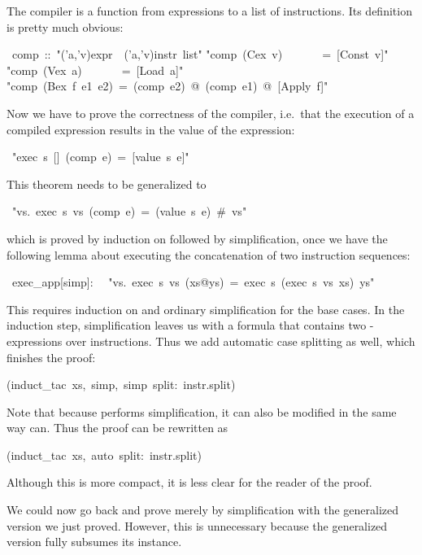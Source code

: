 \begin{isabelle}
\begin{isamarkuptext}
The compiler is a function from expressions to a list of instructions. Its
definition is pretty much obvious:%
\end{isamarkuptext}%
~comp~::~{"}('a,'v)expr~{\isasymRightarrow}~('a,'v)instr~list{"}\isanewline
{}\isanewline
{"}comp~(Cex~v)~~~~~~~=~[Const~v]{"}\isanewline
{"}comp~(Vex~a)~~~~~~~=~[Load~a]{"}\isanewline
{"}comp~(Bex~f~e1~e2)~=~(comp~e2)~@~(comp~e1)~@~[Apply~f]{"}%
\begin{isamarkuptext}%
Now we have to prove the correctness of the compiler, i.e.\ that the
execution of a compiled expression results in the value of the expression:%
\end{isamarkuptext}%
~{"}exec~s~[]~(comp~e)~=~[value~s~e]{"}%
\begin{isamarkuptext}%
\noindent
This theorem needs to be generalized to%
\end{isamarkuptext}%
~{"}{\isasymforall}vs.~exec~s~vs~(comp~e)~=~(value~s~e)~\#~vs{"}%
\begin{isamarkuptxt}%
\noindent
which is proved by induction on  followed by simplification, once
we have the following lemma about executing the concatenation of two
instruction sequences:%
\end{isamarkuptxt}%
~exec\_app[simp]:\isanewline
~~{"}{\isasymforall}vs.~exec~s~vs~(xs@ys)~=~exec~s~(exec~s~vs~xs)~ys{"}%
\begin{isamarkuptxt}%
\noindent
This requires induction on  and ordinary simplification for the
base cases. In the induction step, simplification leaves us with a formula
that contains two -expressions over instructions. Thus we add
automatic case splitting as well, which finishes the proof:%
\end{isamarkuptxt}%
(induct\_tac~xs,~simp,~simp~split:~instr.split)%
\begin{isamarkuptext}%
\noindent
Note that because  performs simplification, it can
also be modified in the same way  can. Thus the proof can be
rewritten as%
\end{isamarkuptext}%
(induct\_tac~xs,~auto~split:~instr.split)%
\begin{isamarkuptext}%
\noindent
Although this is more compact, it is less clear for the reader of the proof.

We could now go back and prove 
merely by simplification with the generalized version we just proved.
However, this is unnecessary because the generalized version fully subsumes
its instance.%
\end{isamarkuptext}%
\end{isabelle}%
